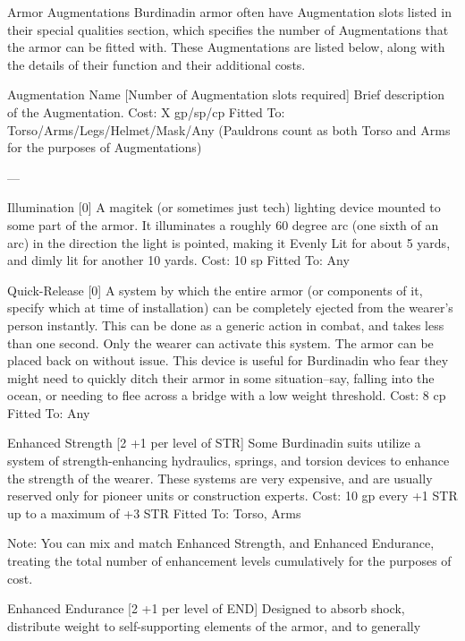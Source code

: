 \documentclass[oneside,11pt,english]{book}
\begin{document}
Armor Augmentations 
Burdinadin armor often have Augmentation slots listed in their special qualities section, which specifies 
the number of Augmentations that the armor can be fitted with. These Augmentations are listed below, 
along with the details of their function and their additional costs. 

 

Augmentation Name [Number of Augmentation slots required] 
Brief description of the Augmentation. 
Cost: X gp/sp/cp 
Fitted To: Torso/Arms/Legs/Helmet/Mask/Any 
(Pauldrons count as both Torso and Arms for the purposes of Augmentations) 

 

--- 

 

Illumination [0] 
A magitek (or sometimes just tech) lighting device mounted to some part of the armor. It illuminates a 
roughly 60 degree arc (one sixth of an arc) in the direction the light is pointed, making it Evenly Lit for 
about 5 yards, and dimly lit for another 10 yards. 
Cost: 10 sp 
Fitted To: Any 

 

Quick-Release [0] 
A system by which the entire armor (or components of it, specify which at time of installation) can be 
completely ejected from the wearer’s person instantly. This can be done as a generic action in combat, 
and takes less than one second. Only the wearer can activate this system. The armor can be placed back 
on without issue. This device is useful for Burdinadin who fear they might need to quickly ditch their 
armor in some situation--say, falling into the ocean, or needing to flee across a bridge with a low weight 
threshold. 
Cost: 8 cp 
Fitted To: Any 

 

Enhanced Strength [2 +1 per level of STR] 
Some Burdinadin suits utilize a system of strength-enhancing hydraulics, springs, and torsion devices to 
enhance the strength of the wearer. These systems are very expensive, and are usually reserved only for 
pioneer units or construction experts. 
Cost: 10 gp every +1 STR up to a maximum of +3 STR 
Fitted To: Torso, Arms 

 

Note: You can mix and match Enhanced Strength, and Enhanced Endurance, treating the total number of 
enhancement levels cumulatively for the purposes of cost. 

 

Enhanced Endurance [2 +1 per level of END] 
Designed to absorb shock, distribute weight to self-supporting elements of the armor, and to generally 
\end{document}
